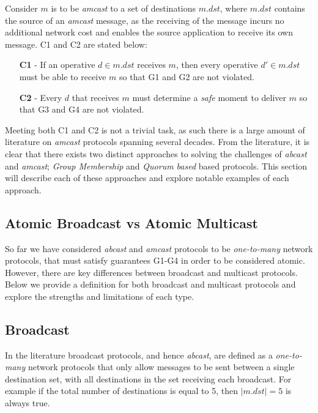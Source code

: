 Consider $m$ is to be \emph{amcast} to a set of destinations $m.dst$, where $m.dst$ contains the source of an \emph{amcast} message, as the receiving of the message incurs no additional network cost and enables the source application to receive its own message.  C1 and C2 are stated below:
\begin{itemize}
    \item[\textbf{C1}] - If an operative $d \in m.dst$ receives $m$, then every operative
     $d' \in m.dst$ must be able to receive $m$ so that G1 and G2 are not violated.
    \item[\textbf{C2}] - Every $d$ that receives $m$ must determine a \emph{safe} moment
to deliver $m$ so that G3 and G4 are not violated.
\end{itemize}

Meeting both C1 and C2 is not a trivial task, as such there is a large amount of literature\cite{Defago:2004:TOB:1041680.1041682} on \emph{amcast} protocols spanning several decades.  From the literature, it is clear that there exists two distinct approaches to solving the challenges of \emph{abcast} and \emph{amcast}; \emph{Group Membership} and \emph{Quorum based} based protocols.  This section will describe each of these approaches and explore notable examples of each approach.  
	
	\subsection{Atomic Broadcast vs Atomic Multicast}
	So far we have considered \emph{abcast} and \emph{amcast} protocols to be \emph{one-to-many} network protocols, that must satisfy guarantees G1-G4 in order to be considered atomic.  However, there are key differences between broadcast and multicast protocols.  Below we provide a definition for both broadcast and multicast protocols and explore the strengths and limitations of each type.  
	
	\subsection{Broadcast}\label{ssec:atomic_broadcast}
	In the literature\cite{Defago:2004:TOB:1041680.1041682} broadcast protocols, and hence \emph{abcast}, are defined as a \emph{one-to-many} network protocols that only allow messages to be sent between a single destination set, with all destinations in the set receiving each broadcast.  For example if the total number of destinations is equal to 5, then $\left\vert{m.dst}\right\vert = 5$ is always true.
	

